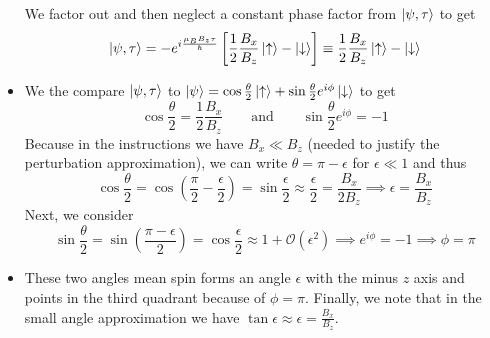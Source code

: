 \documentclass[11pt, a4paper]{article}
\newcommand{\eqtext}[1]{\qquad \text{#1} \qquad}
\newcommand{\Ham}{Hamiltonian\xspace}
\newcommand{\p}{\psi}  %
\newcommand{\ua}{\uparrow}  %
\newcommand{\da}{\downarrow}  %
\begin{document}
\begin{itemize}
	We factor out and then neglect a constant phase factor from $ \ket{\p, \tau} $ to get
	\begin{equation*}
		\ket{\p, \tau} = - e^{i\frac{\mu_{B}B_{z}\tau}{\hbar}}\left[\frac{1}{2}\frac{B_{x}}{B_{z}}\ket{\ua} - \ket{\da}\right] \equiv \frac{1}{2}\frac{B_{x}}{B_{z}}\ket{\ua} - \ket{\da}
	\end{equation*}
	
	\item We the compare $ \ket{\p, \tau} $ to $ \ket{\p} = \cos \frac{\theta}{2}\ket{\ua} + \sin \frac{\theta}{2}e^{i\phi}\ket{\da} $ to get
	\begin{equation*}
		\cos \frac{\theta}{2} = \frac{1}{2}\frac{B_{x}}{B_{z}} \eqtext{and} \sin \frac{\theta}{2}e^{i\phi} = - 1
	\end{equation*}
	Because in the instructions we have $ B_{x} \ll B_{z} $ (needed to justify the perturbation approximation), we can write $ \theta = \pi - \epsilon $ for $ \epsilon \ll 1 $ and thus
	\begin{equation*}
		\cos \frac{\theta}{2} = \cos \left(\frac{\pi}{2} - \frac{\epsilon}{2}\right) = \sin \frac{\epsilon}{2} \approx \frac{\epsilon}{2} = \frac{B_{x}}{2B_{z}} \implies \epsilon = \frac{B_{x}}{B_{z}}
	\end{equation*}
	Next, we consider
	\begin{equation*}
		\sin \frac{\theta}{2} = \sin \left(\frac{\pi - \epsilon}{2}\right) = \cos \frac{\epsilon}{2} \approx 1 + \mathcal{O}(\epsilon^{2}) \implies e^{i\phi} = -1 \implies \phi = \pi
	\end{equation*} 
	
	\item These two angles mean spin forms an angle $ \epsilon $ with the minus $ z $ axis and points in the third quadrant because of $ \phi = \pi $. Finally, we note that in the small angle approximation we have $ \tan \epsilon \approx \epsilon = \frac{B_{x}}{B_{z}}$.
	

\end{itemize}
\end{document}
